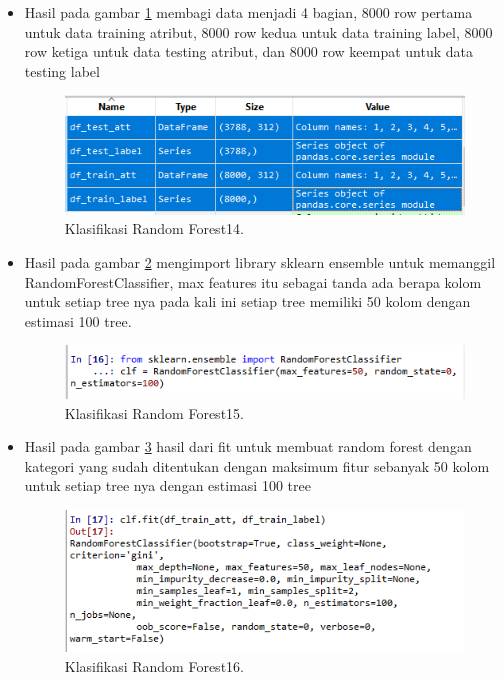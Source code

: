 \begin{enumerate}
\begin{itemize}
\item Hasil pada gambar \ref{rons14} membagi data menjadi 4 bagian, 8000 row pertama untuk data training atribut, 8000 row kedua untuk data training label, 8000 row ketiga untuk data testing atribut, dan 8000 row keempat untuk data testing label
 		\begin{figure}[ht]
		\centerline{\includegraphics[width=1\textwidth]{figures/im/rons14.png}}
		\caption{Klasifikasi Random Forest14.}
		\label{rons14}
		\end{figure}

\item Hasil pada gambar \ref{rons15} mengimport library sklearn ensemble untuk memanggil RandomForestClassifier, max features itu sebagai tanda ada berapa kolom untuk setiap tree nya pada kali ini setiap tree memiliki 50 kolom dengan estimasi 100 tree.
 		\begin{figure}[ht]
		\centerline{\includegraphics[width=1\textwidth]{figures/im/rons15.png}}
		\caption{Klasifikasi Random Forest15.}
		\label{rons15}
		\end{figure}

\item Hasil pada gambar \ref{rons16} hasil dari fit untuk membuat random forest dengan kategori yang sudah ditentukan dengan maksimum fitur sebanyak 50 kolom untuk setiap tree nya dengan estimasi 100 tree
 		\begin{figure}[ht]
		\centerline{\includegraphics[width=1\textwidth]{figures/im/rons16.png}}
		\caption{Klasifikasi Random Forest16.}
		\label{rons16}
		\end{figure}


\end{itemize}
\end{enumerate}
